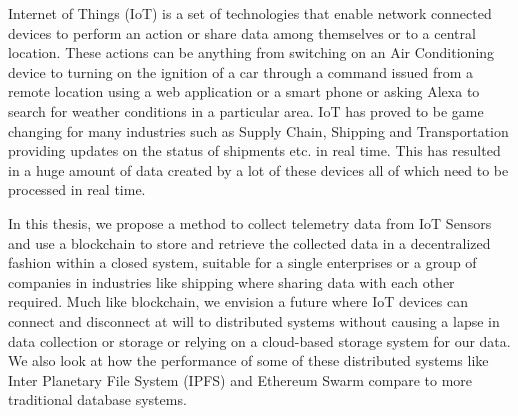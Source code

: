 \documentclass[11pt,openright]{report}
\begin{document}
\thesistitlepage
\copyrightpage

\newpage


\begin{thesisabstract}

Internet of Things (IoT) is a set of technologies that enable network connected devices to perform an action or share data among themselves or to a central location. These actions can be anything from switching on an Air Conditioning device to turning on the ignition of a car through a command issued from a remote location using a web application or a smart phone or asking Alexa to search for weather conditions in a particular area. IoT has proved to be game changing for many industries such as Supply Chain, Shipping and Transportation providing updates on the status of shipments etc. in real time. This has resulted in a huge amount of data created by a lot of these devices all of which need to be processed in real time. 

In this thesis, we propose a method to collect telemetry data from IoT Sensors and use a blockchain to store and retrieve the collected data in a decentralized fashion within a closed system, suitable for a single enterprises or a group of companies in industries like shipping where sharing data with each other required. Much like blockchain, we envision a future where IoT devices can connect and disconnect at will to distributed systems without causing a lapse in data collection or storage or relying on a cloud-based storage system for our data. We also look at how the performance of some of these distributed systems like Inter Planetary File System (IPFS) and Ethereum Swarm compare to more traditional database systems. 

\end{thesisabstract}


\end{document}
